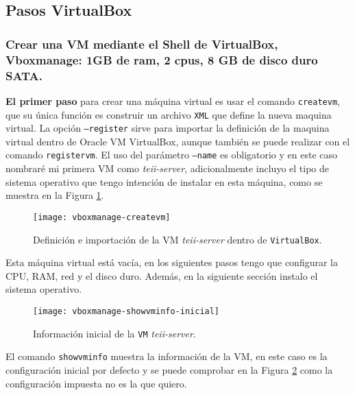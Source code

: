 
\subsection{Pasos VirtualBox}

\subsubsection{Crear una VM mediante el Shell de VirtualBox, Vboxmanage: 1GB de ram, 2 cpus, 8 GB de disco duro SATA.}

\par \textbf{El primer paso} para crear una máquina virtual es usar el comando \texttt{createvm},
que su única función es construir un archivo \texttt{XML} que define la nueva maquina virtual.
La opción \texttt{--register} sirve para importar la definición de la maquina virtual
dentro de Oracle VM VirtualBox, aunque también se puede realizar con el comando 
\texttt{registervm}. El uso del parámetro \texttt{--name} es obligatorio y en este caso 
nombraré mi primera VM como \textit{teii-server}, adicionalmente incluyo el tipo de 
sistema operativo que tengo intención de instalar en esta máquina, como se muestra en 
la Figura \ref{fig:vboxmanage-createvm}.
\begin{figure}[H]
    \texttt{[image: vboxmanage-createvm]}
    \centering
    \caption{Definición e importación de la VM \textit{teii-server} dentro de \texttt{VirtualBox}.}
    \label{fig:vboxmanage-createvm}
 \end{figure}
\par Esta máquina virtual está vacía, en los siguientes pasos tengo que 
configurar la CPU, RAM, red y el disco duro. Además, en la siguiente sección 
instalo el sistema operativo. 
\begin{figure}[H]
    \texttt{[image: vboxmanage-showvminfo-inicial]}
    \centering
    \caption{Información inicial de la \texttt{VM} \textit{teii-server}.}
    \label{fig:vboxmanage-showvminfo-inicial}
 \end{figure}
\par El comando \texttt{showvminfo} muestra la 
información de la VM, en este caso es la configuración inicial por defecto y 
se puede comprobar en la Figura \ref{fig:vboxmanage-showvminfo-inicial} como la configuración impuesta no es la que quiero.

